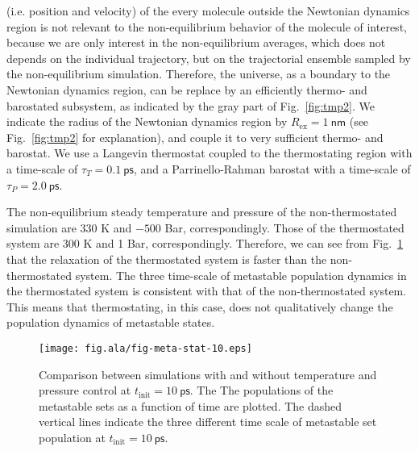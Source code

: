 \documentclass[aip,jcp,a4paper,preprint,onecolumn]{revtex4-1}
\begin{document}
(i.e. position and velocity) of the every molecule outside the
Newtonian dynamics region is not relevant to the non-equilibrium
behavior of the molecule of interest, because we are only interest in
the non-equilibrium averages, which does not depends on the individual
trajectory, but on the trajectorial ensemble sampled by the
non-equilibrium simulation.  Therefore, the universe, as a boundary to
the Newtonian dynamics region, can be replace by
an efficiently thermo- and barostated subsystem, as indicated by the gray
part of Fig.~\ref{fig:tmp2}. 
We indicate the radius of the Newtonian dynamics region by
$R_{\textrm{ex}} = 1~\textsf{nm}$ (see Fig.~\ref{fig:tmp2} for
explanation), and couple it to very sufficient thermo- and
barostat. We use a Langevin thermostat coupled to the thermostating
region with a time-scale of $\tau_{T} = 0.1~\textsf{ps}$, and a
Parrinello-Rahman barostat with a time-scale of $\tau_{P} =
2.0~\textsf{ps}$.

The non-equilibrium steady temperature and pressure of the
non-thermostated simulation are $330$ K and $-500$ Bar,
correspondingly. Those of the thermostated system are $300$ K and 1
Bar, correspondingly. Therefore, we can see from Fig.~\ref{fig:tmp6}
that the relaxation of the thermostated system is faster than the
non-thermostated system. The three time-scale of metastable population
dynamics in the thermostated system is consistent with that of the
non-thermostated system. This means that thermostating, in this case,
does not qualitatively change the population dynamics of metastable
states.

\begin{figure}
  \centering
  \texttt{[image: fig.ala/fig-meta-stat-10.eps]}
  \caption{ Comparison between simulations with and without
    temperature and pressure control at $t_{\textrm{init}} =
    10~\textsf{ps}$. The The populations of the metastable sets as a
    function of time are plotted.  The dashed vertical lines indicate
    the three different time scale of metastable set population at
    $t_{\textrm{init}} = 10~\textsf{ps}$.}
  \label{fig:tmp6}
\end{figure}



\end{document}

